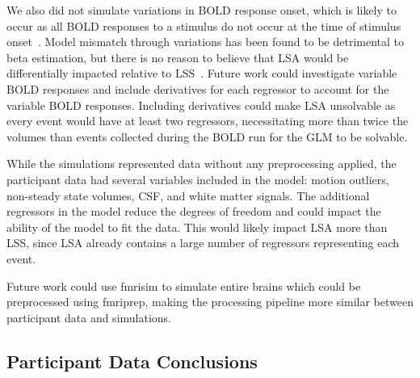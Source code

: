 \documentclass[phd,appendix,figures]{uithesis}
\begin{document}
We also did not simulate variations in BOLD response onset, which is likely to occur
as all BOLD responses to a stimulus do not occur at the time of stimulus onset~\cite{DEsposito2003}.
Model mismatch through variations has been found to be detrimental to beta estimation, 
but there is no reason to believe that LSA would be differentially impacted relative to LSS~\cite{Turner2012a}.
Future work could investigate variable BOLD responses and include derivatives for each regressor to account for
the variable BOLD responses.
Including derivatives could make LSA unsolvable as every event would have at least two regressors, necessitating
more than twice the volumes than events collected during the BOLD run
for the GLM to be solvable.

While the simulations represented data without any preprocessing applied,
the participant data had several variables included in the model: motion outliers, non-steady state volumes,
CSF, and white matter signals.
The additional regressors in the model reduce the degrees of freedom
and could impact the ability of the model to fit the data.
This would likely impact LSA more than LSS, since LSA already contains
a large number of regressors representing each event.

Future work could use fmrisim to simulate entire brains which could be preprocessed using fmriprep,
making the processing pipeline more similar between participant data and simulations.

\subsection*{Participant Data Conclusions}
\label{discussion:taskswitching-conclusions}
\end{document}

